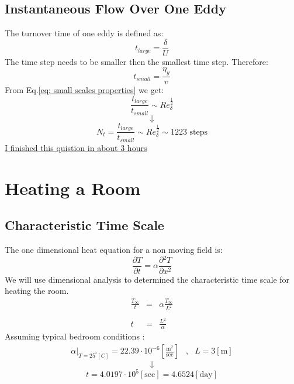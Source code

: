 \documentclass[11pt, a4paper]{article}
\newcommand{\parder}[2]{\frac{\partial {#1}}{\partial {#2}}}
\begin{document}
\subsection{Instantaneous Flow Over One Eddy}
The turnover time of one eddy is defined as:
\begin{equation}
    t_{large}=\frac{\delta}{U}
\end{equation}
The time step needs to be smaller then the smallest time step. Therefore:
\begin{equation}
    t_{small}=\frac{\eta_y}{v}
\end{equation}
From Eq.\ref{eq: small scales properties} we get:
\begin{equation}
    \frac{t_{large}}{t_{small}}\sim{Re}_\delta^\frac{1}{2}
\end{equation}
\begin{equation*}
    \Downarrow
\end{equation*}
\begin{equation}
    N_t=\frac{t_{large}}{t_{small}}\sim{Re}_\delta^\frac{1}{2}\sim1223\text{ steps}
\end{equation}
\underline{I finished this quistion in about 3 hours}

\section{Heating a Room}
\subsection{Characteristic Time Scale}
The one dimensional heat equation for a non moving field is:
\begin{equation}
    \parder{T}{t}=\alpha\parder{^2T}{x^2}
\end{equation}
We will use dimensional analysis to determined the characteristic time scale for heating the room.
\begin{equation}
    \begin{array}{rcl}
        \displaystyle\frac{T_\infty}{t} & = & \displaystyle\alpha\frac{T_\infty}{L^2} \\\\
        t & = & \displaystyle\frac{L^2}{\alpha}
    \end{array}
\end{equation}
Assuming typical bedroom conditions \cite{air_thermal_diffusivity}:
\begin{equation*}
    \begin{matrix}
        \displaystyle\left.\alpha\right|_\text{$T=25^\circ[C]$}=22.39\cdot10^{-6}\left[\frac{\mathrm{m}^2}{\mathrm{sec}}\right] &,& L=3\left[\mathrm{m}\right]
    \end{matrix}
\end{equation*}
\begin{equation*}
    \Downarrow
\end{equation*}
\begin{equation}
    t=4.0197\cdot10^5\left[\mathrm{sec}\right]=4.6524\left[\mathrm{day}\right]
\end{equation}
\end{document}
